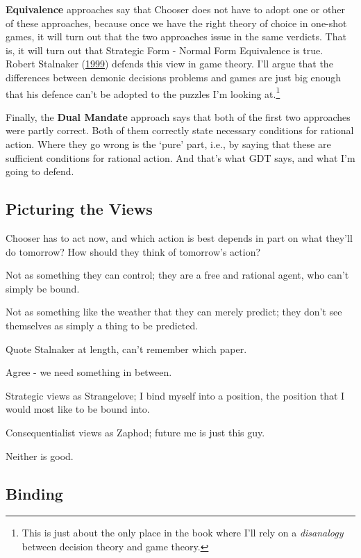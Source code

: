 \documentclass[
  12pt,
  letterpaper,
  DIV=11,
  numbers=noendperiod]{scrreprt}
\begin{document}
\textbf{Equivalence} approaches say that Chooser does not have to adopt
one or other of these approaches, because once we have the right theory
of choice in one-shot games, it will turn out that the two approaches
issue in the same verdicts. That is, it will turn out that Strategic
Form - Normal Form Equivalence is true. Robert Stalnaker
(\protect\hyperlink{ref-Stalnaker1999}{1999}) defends this view in game
theory. I'll argue that the differences between demonic decisions
problems and games are just big enough that his defence can't be adopted
to the puzzles I'm looking at.\footnote{This is just about the only
  place in the book where I'll rely on a \emph{disanalogy} between
  decision theory and game theory.}

Finally, the \textbf{Dual Mandate} approach says that both of the first
two approaches were partly correct. Both of them correctly state
necessary conditions for rational action. Where they go wrong is the
`pure' part, i.e., by saying that these are sufficient conditions for
rational action. And that's what GDT says, and what I'm going to defend.

\hypertarget{sec-four-pictures}{%
\subsection{Picturing the Views}\label{sec-four-pictures}}

Chooser has to act now, and which action is best depends in part on what
they'll do tomorrow? How should they think of tomorrow's action?

Not as something they can control; they are a free and rational agent,
who can't simply be bound.

Not as something like the weather that they can merely predict; they
don't see themselves as simply a thing to be predicted.

Quote Stalnaker at length, can't remember which paper.

Agree - we need something in between.

Strategic views as Strangelove; I bind myself into a position, the
position that I would most like to be bound into.

Consequentialist views as Zaphod; future me is just this guy.

Neither is good.

\hypertarget{sec-binding}{%
\subsection{Binding}\label{sec-binding}}
\end{document}
